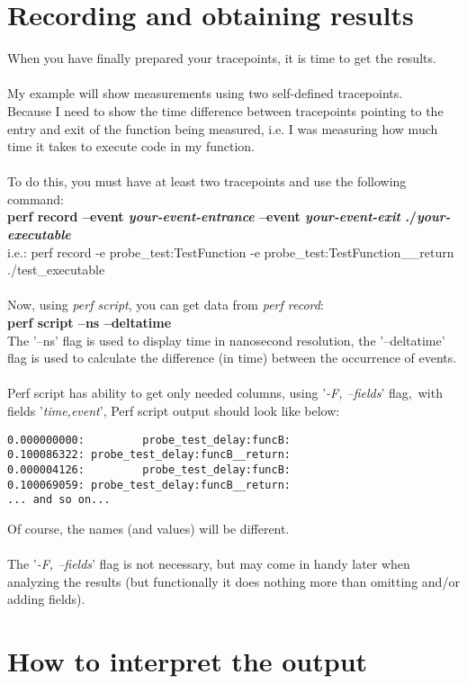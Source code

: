 \documentclass[11pt,onecolumn]{article}
\begin{document}
\section{Recording and obtaining results}

When you have finally prepared your tracepoints, it is time to get the results.\\\\
My example will show measurements using two self-defined tracepoints.\\
Because I need to show the time difference between tracepoints pointing to the entry and exit of the function being measured, i.e. I was measuring how much time it takes to execute code in my function.\\\\
To do this, you must have at least two tracepoints and use the following command:\\
\textbf{perf record --event \textit{your-event-entrance} --event \textit{your-event-exit} ./\textit{your-executable}}\\
i.e.: perf record -e probe\_test:TestFunction -e probe\_test:TestFunction\_\_return ./test\_executable\\\\
Now, using \textit{perf script}, you can get data from \textit{perf record}:\\
\textbf{perf script --ns --deltatime}\\
The '--ns' flag is used to display time in nanosecond resolution, the '--deltatime' flag is used to calculate the difference (in time) between the occurrence of events.\\\\
Perf script has ability to get only needed columns, using '\textit{-F, --fields}' flag,\
with fields '\textit{time,event}', Perf script output should look like below:
\begin{verbatim}
0.000000000:         probe_test_delay:funcB: 
0.100086322: probe_test_delay:funcB__return: 
0.000004126:         probe_test_delay:funcB: 
0.100069059: probe_test_delay:funcB__return:
... and so on...
\end{verbatim}
Of course, the names (and values) will be different.\\\\
The '\textit{-F, --fields}' flag is not necessary, but may come in handy later when analyzing the results (but functionally it does nothing more than omitting and/or adding fields).

\section{How to interpret the output}
\end{document}
